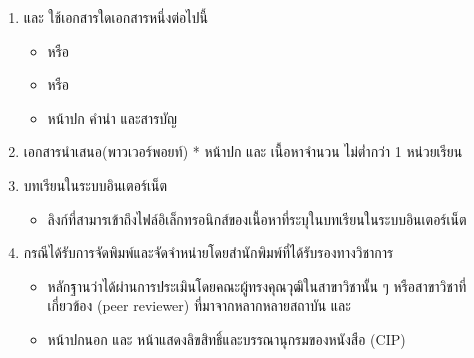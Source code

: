 \documentclass[a4paper,12pt,english]{sphinxmanual}
\begin{document}
\begin{enumerate}
%
\item {} 
{\hyperref[\detokenize{glossary:term-0}]{}} {\hyperref[\detokenize{glossary:term-1}]{}} {\hyperref[\detokenize{glossary:term-2}]{}} และ {\hyperref[\detokenize{glossary:term-3}]{}} ใช้เอกสารใดเอกสารหนึ่งต่อไปนี้
\begin{itemize}
\item {} 
{\hyperref[\detokenize{glossary:term-7}]{}}  หรือ

\item {} 
{\hyperref[\detokenize{glossary:term-8}]{}}  หรือ

\item {} 
หน้าปก คำนำ และสารบัญ

\end{itemize}

\item {} 
เอกสารนำเสนอ(พาวเวอร์พอยท์)
* หน้าปก และ เนื้อหาจำนวน ไม่ต่ำกว่า 1 หน่วยเรียน

\item {} 
บทเรียนในระบบอินเตอร์เน็ต
\begin{itemize}
\item {} 
ลิงก์ที่สามารเข้าถึงไฟล์อิเล็กทรอนิกส์ของเนื้อหาที่ระบุในบทเรียนในระบบอินเตอร์เน็ต

\end{itemize}

\item {} 
{\hyperref[\detokenize{glossary:term-2}]{}} กรณีได้รับการจัดพิมพ์และจัดจำหน่ายโดยสำนักพิมพ์ที่ได้รับรองทางวิชาการ
\begin{itemize}
\item {} 
หลักฐานว่าได้ผ่านการประเมินโดยคณะผู้ทรงคุณวุฒิในสาขาวิชานั้น ๆ หรือสาขาวิชาที่เกี่ยวข้อง (peer reviewer) ที่มาจากหลากหลายสถาบัน และ

\item {} 
หน้าปกนอก และ หน้าแสดงลิขสิทธิ์และบรรณานุกรมของหนังสือ (CIP)

\end{itemize}

\end{enumerate}
\end{document}
